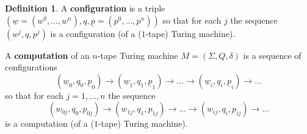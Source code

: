 \documentclass[12pt]{article}
\theoremstyle{plain}
\theoremstyle{definition}
\newtheorem{defn}[thm]{Definition} %
\newcommand{\lto}{\longrightarrow}
\begin{document}
	\begin{defn}
		A \textbf{configuration} is a triple $(\underline{w} = (w^0, \ldots, w^n), q, \underline{p} = (p^0, \ldots, p^n))$ so that for each $j$ the sequence $(w^j,q, p^j)$ is a configuration (of a ($1$-tape) Turing machine).
		
		A \textbf{computation} of an $n$-tape Turing machine $M = (\Sigma, Q, \delta)$ is a sequence of configurations
		\begin{equation}
			(\underline{w}_0, q_0, \underline{p}_0) \lto (\underline{w}_1, q_1, \underline{p}_1) \lto  \ldots \lto  (\underline{w}_i, q_i, \underline{p}_i) \lto \ldots
			\end{equation}
		so that for each $j = 1,\ldots, n$ the sequence
		\begin{equation}
			(w_{0j}, q_0, p_{0j}) \lto (w_{1j}, q_1, p_{1j}) \lto \ldots \lto (w_{ij}, q_i, p_{ij}) \lto \ldots
			\end{equation}
		is a computation (of a ($1$-tape) Turing machine).
		\end{defn}
	
\end{document}
